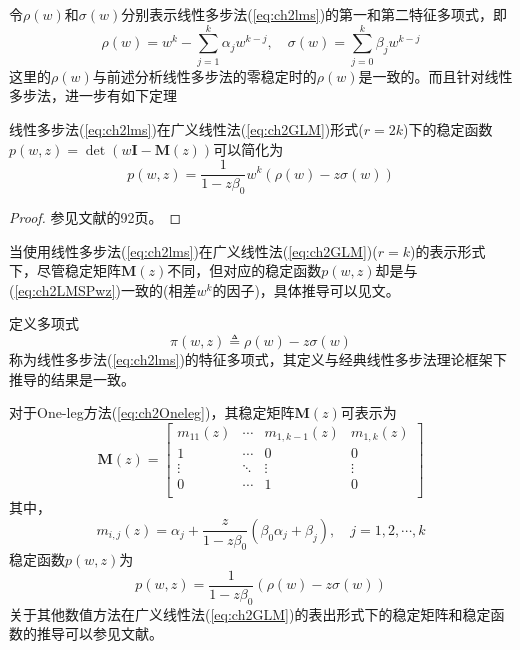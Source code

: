 令$\rho(w)$和$\sigma(w)$分别表示线性多步法(\ref{eq:ch2lms})的第一和第二特征多项式，即
\begin{equation}
\rho(w)=w^k-\sum_{j=1}^{k}\alpha_jw^{k-j},\quad \sigma(w)=\sum_{j=0}^{k}\beta_jw^{k-j}
\end{equation}
这里的$\rho(w)$与前述分析线性多步法的零稳定时的$\rho(w)$是一致的。而且针对线性多步法，进一步有如下定理
\begin{theorem}
线性多步法(\ref{eq:ch2lms})在广义线性法(\ref{eq:ch2GLM})形式($r=2k$)下的稳定函数$p(w,z)=\det(w\bm{I}-\bm{M}(z))$可以简化为
\begin{equation}
p(w,z)=\frac{1}{1-z\beta_0}w^k(\rho(w)-z\sigma(w))\label{eq:ch2LMSPwz}
\end{equation}
\end{theorem}

\begin{proof}
参见文献的92页。
\end{proof}

当使用线性多步法(\ref{eq:ch2lms})在广义线性法(\ref{eq:ch2GLM})($r=k$)的表示形式下，尽管稳定矩阵$\bm{M}(z)$不同，但对应的稳定函数$p(w,z)$却是与(\ref{eq:ch2LMSPwz})一致的(相差$w^k$的因子)，具体推导可以见文。

定义多项式\begin{equation}
\pi(w,z)\triangleq\rho(w)-z\sigma(w)\label{eq:ch2lmsCharaPoly}
\end{equation}
称为线性多步法(\ref{eq:ch2lms})的特征多项式，其定义与经典线性多步法理论框架\cite{LiShouFo2010a,Butcher2016a,Gear1971c,ErnstHairer1993a,ErnstHairer1996a,Butcher1987a,Fatunla1988a,YuanZhaoDing1987a}下推导的结果是一致。

对于One-leg方法(\ref{eq:ch2Oneleg})，其稳定矩阵$\bm{M}(z)$可表示为
\begin{equation}
\bm{M}(z)=\begin{bmatrix}
m_{11}(z) & \cdots & m_{1,k-1}(z) & m_{1,k}(z)\\
1 & \cdots & 0 & 0\\
\vdots & \ddots & \vdots & \vdots\\
0 & \cdots & 1 & 0\\
\end{bmatrix}
\end{equation}
其中，\begin{equation}
m_{i,j}(z)=\alpha_j+\frac{z}{1-z\beta_0}(\beta_0\alpha_j+\beta_j),\quad j=1,2,\cdots,k
\end{equation}
稳定函数$p(w,z)$为\begin{equation}
p(w,z)=\frac{1}{1-z\beta_0}(\rho(w)-z\sigma(w))
\end{equation}
关于其他数值方法在广义线性法(\ref{eq:ch2GLM})的表出形式下的稳定矩阵和稳定函数的推导可以参见文献。

